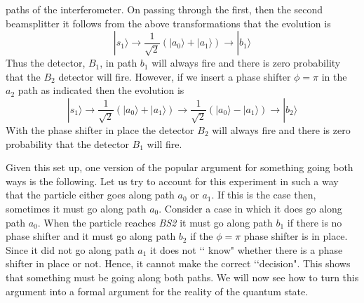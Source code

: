 \documentclass[12pt]{article}
\begin{document}
paths of the interferometer.  On passing through the first, then the second beamsplitter it follows from the above transformations that the evolution is \begin{equation} |s_1\rangle
\longrightarrow \frac{1}{\sqrt{2}} ( |a_0\rangle + |a_1\rangle ) \longrightarrow |b_1\rangle \end{equation} Thus the detector, $B_1$, in path $b_1$ will always fire and there is zero
probability that the $B_2$ detector will fire. However, if we insert a phase shifter $\phi=\pi$ in the $a_2$ path as indicated then the evolution is \begin{equation} |s_1\rangle
\longrightarrow \frac{1}{\sqrt{2}} ( |a_0\rangle + |a_1\rangle ) \longrightarrow \frac{1}{\sqrt{2}} ( |a_0\rangle - |a_1\rangle )\longrightarrow |b_2\rangle \end{equation} With the phase
shifter in place the detector $B_2$ will always fire and there is zero probability that the detector $B_1$ will fire.

Given this set up, one version of the popular argument for something going both ways is the following.  Let us try to account for this experiment in such a way that the particle either goes
along path $a_0$ or $a_1$.  If this is the case then, sometimes it must go along path $a_0$.  Consider a case in which it does go along path $a_0$.  When the particle reaches \emph{BS2} it
must go along path $b_1$ if there is no phase shifter and it must go along path $b_2$ if the $\phi=\pi$ phase shifter is in place. Since it did not go along path $a_1$ it does not \lq\lq
know" whether there is a phase shifter in place or not.  Hence, it cannot make the correct \lq\lq decision".  This shows that something must be going along both paths.  We will now see how
to turn this argument into a formal argument for the reality of the quantum state.
\end{document}
